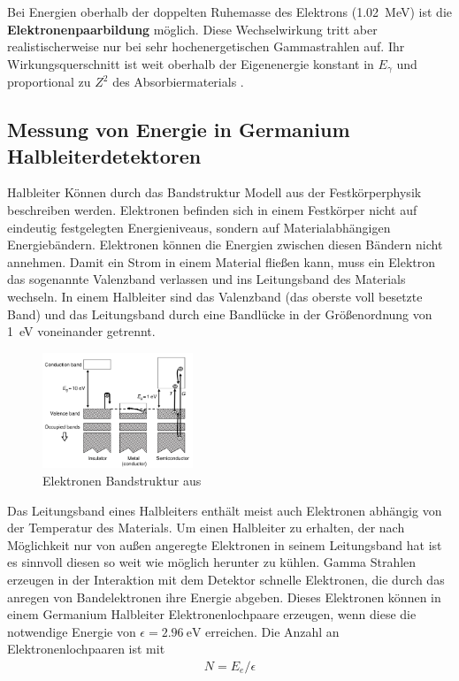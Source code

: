 Bei Energien oberhalb der doppelten Ruhemasse des Elektrons (\qty{1.02}{\MeV})
ist die \textbf{Elektronenpaarbildung} möglich. Diese Wechselwirkung tritt aber
realistischerweise nur bei sehr hochenergetischen Gammastrahlen auf. Ihr
Wirkungsquerschnitt ist weit oberhalb der Eigenenergie konstant in $E_\gamma$
und proportional zu $Z^2$ des Absorbiermaterials \cite[vgl.][Kap
	3.5.5]{book:kolano}.

\subsection{Messung von Energie in Germanium Halbleiterdetektoren \cite{book:gil}}

Halbleiter Können durch das Bandstruktur Modell aus der Festkörperphysik
beschreiben werden. Elektronen befinden sich in einem Festkörper nicht auf
eindeutig festgelegten Energieniveaus, sondern auf Materialabhängigen
Energiebändern. Elektronen können die Energien zwischen diesen Bändern nicht
annehmen. Damit ein Strom in einem Material fließen kann, muss ein Elektron das
sogenannte Valenzband verlassen und ins Leitungsband des Materials wechseln. In
einem Halbleiter sind das Valenzband (das oberste voll besetzte Band) und das
Leitungsband durch eine Bandlücke in der Größenordnung von \qty{1}{\eV}
voneinander getrennt.
\begin{figure}
	\centering
	\includegraphics[width=0.4\textwidth]{./Bilder/ElectronBandsGilmore.png}
	\caption{Elektronen Bandstruktur aus \cite{book:gil}}\label{fig:eband}
\end{figure}
Das Leitungsband eines Halbleiters enthält meist auch Elektronen abhängig von
der Temperatur des Materials.
Um einen Halbleiter zu erhalten, der nach Möglichkeit nur von außen angeregte
Elektronen in seinem Leitungsband hat ist es sinnvoll diesen so weit wie
möglich herunter zu kühlen. Gamma Strahlen erzeugen in der Interaktion mit dem
Detektor schnelle Elektronen, die durch das anregen von Bandelektronen ihre
Energie abgeben. Dieses Elektronen können in einem Germanium Halbleiter
Elektronenlochpaare erzeugen, wenn diese die notwendige Energie von $\epsilon =
	\qty{2.96}{\eV}$ erreichen. Die Anzahl an Elektronenlochpaaren ist mit
\begin{align}
	N = E_e / \epsilon
\end{align}

